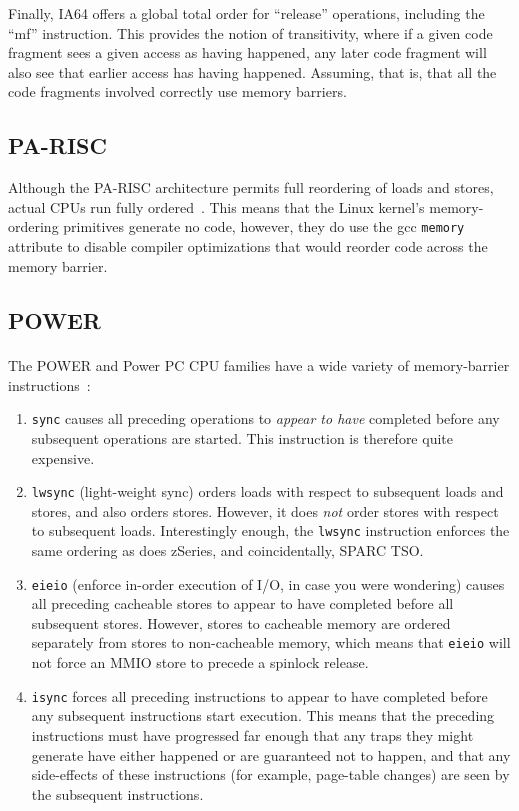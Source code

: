 Finally, IA64 offers a global total order for ``release'' operations,
including the ``mf'' instruction.
This provides the notion of transitivity, where if a given code fragment
sees a given access as having happened, any later code fragment will
also see that earlier access has having happened.
Assuming, that is, that all the code fragments involved correctly use
memory barriers.

\subsection{PA-RISC}

Although the PA-RISC architecture permits full reordering of loads and
stores, actual CPUs run fully ordered~\cite{GerryKane96a}.
This means that the Linux kernel's memory-ordering primitives generate
no code, however, they do use the gcc {\tt memory} attribute to disable
compiler optimizations that would reorder code across the memory
barrier.

\subsection{POWER}

The POWER and Power PC\textsuperscript{\textregistered}
CPU families have a wide variety of memory-barrier
instructions~\cite{PowerPC94,MichaelLyons02a}:
\begin{enumerate}
\item	{\tt sync} causes all preceding operations to {\em appear to have}
	completed before any subsequent operations are started.
	This instruction is therefore quite expensive.
\item	{\tt lwsync} (light-weight sync) orders loads with respect to
	subsequent loads and stores, and also orders stores.
	However, it does {\em not} order stores with respect to subsequent
	loads.
	Interestingly enough, the {\tt lwsync} instruction enforces
	the same ordering as does zSeries, and coincidentally,
	SPARC TSO.
\item	{\tt eieio} (enforce in-order execution of I/O, in case you
	were wondering) causes all preceding cacheable stores to appear
	to have completed before all subsequent stores.
	However, stores to cacheable memory are ordered separately from
	stores to non-cacheable memory, which means that {\tt eieio}
	will not force an MMIO store to precede a spinlock release.
\item	{\tt isync} forces all preceding instructions to appear to have
	completed before any subsequent instructions start execution.
	This means that the preceding instructions must have progressed
	far enough that any traps they might generate have either happened
	or are guaranteed not to happen, and that any side-effects of
	these instructions (for example, page-table changes) are seen by the
	subsequent instructions.
\end{enumerate}

